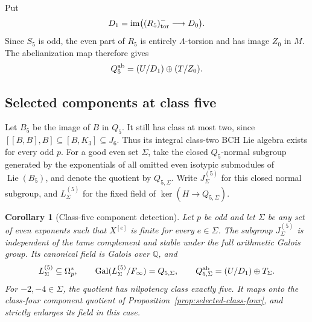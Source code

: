 \documentclass[11pt]{article}
\newtheorem{corollary}[theorem]{Corollary}
\theoremstyle{definition}\newtheorem{definition}[theorem]{Definition}
\begin{document}
Put
\[
 D_1=\operatorname{im}\bigl((R_5)_{\rm tor}^-
                                         \longrightarrow D_0\bigr).
\]
Since $S_5$ is odd, the even part of $R_5$ is entirely
$\Lambda$-torsion and has image $Z_0$ in $M$.
The abelianization map therefore gives
\begin{equation}\label{eq:class5-abelianization}
                         Q_5^{\rm ab}=(U/D_1)\oplus(T/Z_0).
\end{equation}

\subsection{Selected components at class five}
\label{subsec:selected-class-five}

Let $B_5$ be the image of $B$ in $Q_5$. It still has
class at most two, since
$[[B,B],B]\subseteq[B,K_3]\subseteq J_6$.
Thus its integral class-two BCH Lie algebra exists
for every odd $p$. For a good even set $\Sigma$, take
the closed $Q_5$-normal subgroup generated by the
exponentials of all omitted even isotypic submodules
of $\operatorname{Lie}(B_5)$, and denote the quotient
by $Q_{5,\Sigma}$. Write $J_\Sigma^{(5)}$ for this closed normal subgroup, and $L_\Sigma^{(5)}$ for the fixed field of $\ker(H\to Q_{5,\Sigma})$.



\begin{corollary}[Class-five component detection]
\label{cor:selected-class-five}
Let $p$ be odd and let $\Sigma$ be any set of even exponents
such that $X^{[e]}$ is finite for every $e\in\Sigma$.
The subgroup $J_\Sigma^{(5)}$ is independent of the tame
complement and stable under the full arithmetic Galois group.
Its canonical field is Galois over $\mathbb Q$, and
\[
 L_\Sigma^{(5)}\subseteq\Omega_p^*,\qquad
 \operatorname{Gal}(L_\Sigma^{(5)}/F_\infty)=Q_{5,\Sigma},\qquad
 Q_{5,\Sigma}^{\rm ab}=(U/D_1)\oplus T_\Sigma.
\]
For $-2,-4\in\Sigma$, the quotient has nilpotency class
exactly five. It maps onto the class-four component
quotient of Proposition~\ref{prop:selected-class-four},
and strictly enlarges its field in this case.
\end{corollary}
\end{document}
